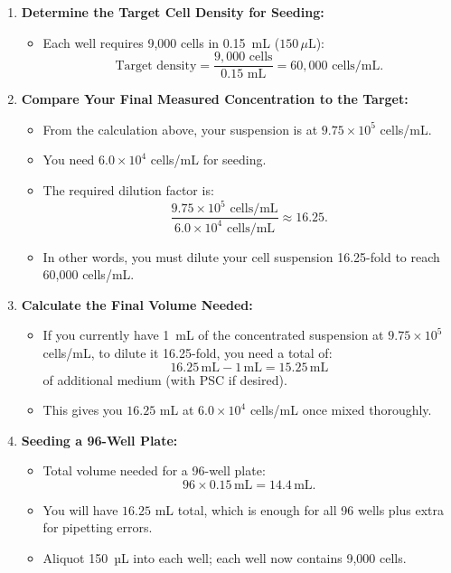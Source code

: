 \documentclass[11pt]{article}
\begin{document}
\begin{enumerate}[leftmargin=*]
    \item \textbf{Determine the Target Cell Density for Seeding:}
    \begin{itemize}[leftmargin=*]
        \item Each well requires 9,000 cells in 0.15~mL (\(150\,\mu\text{L}\)):
        \[
            \text{Target density} = \dfrac{9,000 \text{ cells}}{0.15 \text{ mL}} 
            = 60{,}000 \text{ cells/mL}.
        \]
    \end{itemize}

    \item \textbf{Compare Your Final Measured Concentration to the Target:}
    \begin{itemize}[leftmargin=*]
        \item From the calculation above, your suspension is at \(9.75 \times 10^5\) cells/mL.
        \item You need \(6.0 \times 10^4\) cells/mL for seeding.
        \item The required dilution factor is:
        \[
            \dfrac{9.75 \times 10^5 \text{ cells/mL}}{6.0 \times 10^4 \text{ cells/mL}}
            \approx 16.25.
        \]
        \item In other words, you must dilute your cell suspension 16.25-fold to reach 60,000 cells/mL.
    \end{itemize}

    \item \textbf{Calculate the Final Volume Needed:}
    \begin{itemize}[leftmargin=*]
        \item If you currently have 1~mL of the concentrated suspension at \(9.75 \times 10^5\) cells/mL, to dilute it 16.25-fold, you need a total of:
        \[
            16.25\,\text{mL} - 1\,\text{mL} = 15.25\,\text{mL} 
        \]
        of additional medium (with PSC if desired).
        \item This gives you \(16.25\) mL at \(6.0 \times 10^4\) cells/mL once mixed thoroughly.
    \end{itemize}

    \item \textbf{Seeding a 96-Well Plate:}
    \begin{itemize}[leftmargin=*]
        \item Total volume needed for a 96-well plate:
        \[
            96 \times 0.15\,\text{mL} = 14.4\,\text{mL}.
        \]
        \item You will have \(16.25\) mL total, which is enough for all 96 wells plus extra for pipetting errors.
        \item Aliquot 150~µL into each well; each well now contains 9,000 cells.
    \end{itemize}
\end{enumerate}
\end{document}
